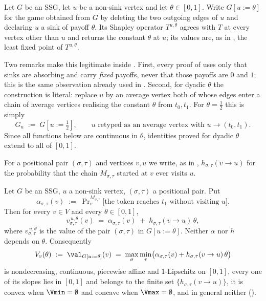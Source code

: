 \begin{definition}\label{def:bv-freeze}
Let $G$ be an SSG, let $u$ be a non-sink vertex and let
$\theta\in[0,1]$. Write $G[u{:=}\theta]$ for the game obtained from $G$
by deleting the two outgoing edges of $u$ and declaring $u$ a sink of
payoff $\theta$. Its Shapley operator $T^{u,\theta}$ agrees with $T$ at
every vertex other than $u$ and returns the constant $\theta$ at $u$; its
values are, as in , the least fixed point of
$T^{u,\theta}$.

Two remarks make this legitimate inside . First, every
proof of  uses only that sinks are
absorbing and carry \emph{fixed} payoffs, never that those payoffs are
$0$ and $1$; this is the same observation already used in
. Second, for dyadic $\theta$ the construction is
literal: replace $u$ by an average vertex both of whose edges enter a
chain of average vertices realising the constant $\theta$ from
$t_0,t_1$. For $\theta=\tfrac12$ this is simply
\[
   G_u\;:=\;G[u{:=}\tfrac12],\qquad u \text{ retyped as an average vertex with } u\to(t_0,t_1).
\]
Since all functions below are continuous in $\theta$, identities proved
for dyadic $\theta$ extend to all of $[0,1]$.

For a positional pair $(\sigma,\tau)$ and vertices $v,u$ we write, as in
, $h_{\sigma,\tau}(v\to u)$ for the probability that
the chain $M_{\sigma,\tau}$ started at $v$ ever visits $u$.
\end{definition}

\begin{theorem}\label{thm:bv-affine}
Let $G$ be an SSG, $u$ a non-sink vertex, $(\sigma,\tau)$ a positional
pair. Put
\[
  \alpha_{\sigma,\tau}(v)\;:=\;\Pr\nolimits^{M_{\sigma,\tau}}_{v}
     \bigl[\text{the token reaches } t_1 \text{ without visiting } u\bigr].
\]
Then for every $v\in V$ and every $\theta\in[0,1]$,
\[
  v^{\,u,\theta}_{\sigma,\tau}(v)\;=\;\alpha_{\sigma,\tau}(v)
      \;+\;h_{\sigma,\tau}(v\to u)\,\theta ,
\]
where $v^{\,u,\theta}_{\sigma,\tau}$ is the value of the pair
$(\sigma,\tau)$ in $G[u{:=}\theta]$. Neither $\alpha$ nor $h$ depends on
$\theta$. Consequently
\[
  V_v(\theta)\;:=\;\val_{G[u:=\theta]}(v)\;=\;
  \max_{\sigma}\min_{\tau}\bigl(\alpha_{\sigma,\tau}(v)+h_{\sigma,\tau}(v\to u)\,\theta\bigr)
\]
is nondecreasing, continuous, piecewise affine and $1$-Lipschitz on
$[0,1]$, every one of its slopes lies in $[0,1]$ and belongs to the finite
set $\{h_{\sigma,\tau}(v\to u)\}$, it is convex when $\Vmin=\emptyset$
and concave when $\Vmax=\emptyset$, and in general neither
().
\end{theorem}

